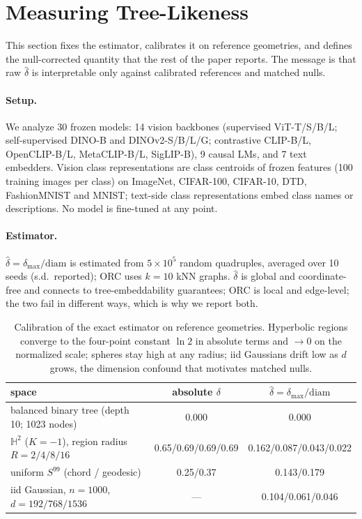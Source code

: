 \documentclass{article} %
\begin{document}
\section{Measuring Tree-Likeness}
\label{sec:method}

This section fixes the estimator, calibrates it on reference geometries, and defines the null-corrected quantity that the rest of the paper reports. The message is that raw $\hat\delta$ is interpretable only against calibrated references and matched nulls.

\paragraph{Setup.} We analyze 30 frozen models: 14 vision backbones (supervised ViT-T/S/B/L; self-supervised DINO-B and DINOv2-S/B/L/G; contrastive CLIP-B/L, OpenCLIP-B/L, MetaCLIP-B/L, SigLIP-B), 9 causal LMs, and 7 text embedders. %
Vision class representations are class centroids of frozen features (100 training images per class) on ImageNet, CIFAR-100, CIFAR-10, DTD, FashionMNIST and MNIST; text-side class representations embed class names or descriptions. No model is fine-tuned at any point.

\paragraph{Estimator.} $\hat\delta = \delta_{\max}/\mathrm{diam}$ is estimated from $5{\times}10^5$ random quadruples, averaged over 10 seeds (s.d.\ reported); ORC uses $k{=}10$ kNN graphs. $\hat\delta$ is global and coordinate-free and connects to tree-embeddability guarantees; ORC is local and edge-level; the two fail in different ways, which is why we report both.

\begin{table}[t]
\centering
\small
\begin{tabular}{lcc}
\toprule
space & absolute $\delta$ & $\hat\delta=\delta_{\max}/\mathrm{diam}$ \\
\midrule
balanced binary tree (depth 10; 1023 nodes) & 0.000 & 0.000 \\
$\mathbb{H}^2$ ($K{=}-1$), region radius $R{=}2/4/8/16$ & 0.65/0.69/0.69/0.69 & 0.162/0.087/0.043/0.022 \\
uniform $S^{99}$ (chord / geodesic) & 0.25/0.37 & 0.143/0.179 \\
iid Gaussian, $n{=}1000$, $d{=}192/768/1536$ & --- & 0.104/0.061/0.046 \\
\bottomrule
\end{tabular}
\caption{Calibration of the exact estimator on reference geometries. Hyperbolic regions converge to the four-point constant $\ln 2$ in absolute terms and $\to 0$ on the normalized scale; spheres stay high at any radius; iid Gaussians drift low as $d$ grows, the dimension confound that motivates matched nulls. %
}
\label{tab:calibration}
\end{table}
\end{document}
